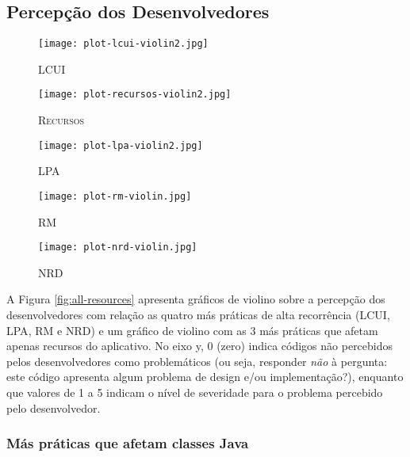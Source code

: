 \subsection{Percepção dos Desenvolvedores}

\begin{figure*}
\centering
\begin{subfigure}{.22\textwidth}
  \centering
  \texttt{[image: plot-lcui-violin2.jpg]}
  \caption{\textsc{LCUI}}
  \label{fig:lcui}
\end{subfigure}%
\begin{subfigure}{.17\textwidth}
  \centering
  \texttt{[image: plot-recursos-violin2.jpg]}
  \caption{\textsc{Recursos}}
  \label{fig:resources}
\end{subfigure}%
\begin{subfigure}{.17\textwidth}
  \centering
  \texttt{[image: plot-lpa-violin2.jpg]}
  \caption{\textsc{LPA}}
  \label{fig:lpa}
\end{subfigure}%
\begin{subfigure}{.17\textwidth}
  \centering
  \texttt{[image: plot-rm-violin.jpg]}
  \caption{\textsc{RM}}
  \label{fig:rm}
\end{subfigure}
\begin{subfigure}{.17\textwidth}
  \centering
  \texttt{[image: plot-nrd-violin.jpg]}
  \caption{\textsc{NRD}}
  \label{fig:nrd}
\end{subfigure}%
\caption{Gráficos violino das más práticas \textsc{LCUI}, \textsc{LPA}, \textsc{RM} e \textsc{NRD}.}
\label{fig:all-resources}
\vspace{-.5cm} 
\end{figure*}


A Figura \ref{fig:all-resources} apresenta gráficos de violino sobre a percepção dos desenvolvedores com relação as quatro más práticas de alta recorrência (\textsc{LCUI}, \textsc{LPA}, \textsc{RM} e \textsc{NRD}) e um gráfico de violino com as 3 más práticas que afetam apenas recursos do aplicativo. No eixo y, 0 (zero) indica códigos não percebidos pelos desenvolvedores como problemáticos (ou seja, responder \emph{não} à pergunta: este código apresenta algum problema de design e/ou implementação?), enquanto que valores de 1 a 5 indicam o nível de severidade para o problema percebido pelo desenvolvedor.

\subsubsection{Más práticas que afetam classes Java}

